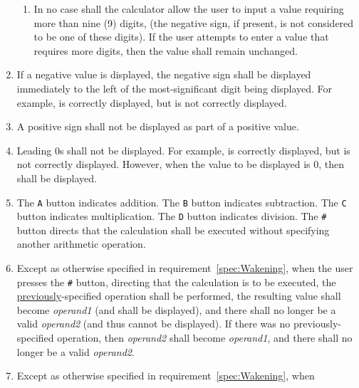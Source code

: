 \begin{enumerate}
\begin{enumerate}

    \item In no case shall the calculator allow the user to input a value requiring more than nine (9) digits, (the negative sign, if present, is not considered to be one of these digits). If the user attempts to enter a value that requires more digits, then the value shall remain unchanged.

    \end{enumerate}
\item \label{spec:Negative} If a negative value is displayed, the negative sign
    shall be displayed immediately to the left of the most-significant digit
    being displayed. For example,  is correctly displayed, but
     is not correctly displayed.
\item \label{spec:Positive} A positive sign shall not be displayed as part of a
    positive value.
\item \label{spec:LeadingZeroes} Leading 0s shall not be displayed. For
    example,  is correctly displayed, but  is
    not correctly displayed. However, when the value to be displayed is 0, then
     shall be displayed.
\item The \texttt{A} button indicates addition. The \texttt{B} button indicates
    subtraction. The \texttt{C} button indicates multiplication. The \texttt{D}
    button indicates division. The \texttt{\#} button directs that the
    calculation shall be executed without specifying another arithmetic
    operation.
\item Except as otherwise specified in requirement~\ref{spec:Wakening}, when
    the user presses the \texttt{\#} button, directing that the calculation is
    to be executed, the \underline{previously}-specified operation shall be
    performed, the resulting value shall become \textit{operand1} (and shall be
    displayed), and there shall no longer be a valid \textit{operand2} (and thus cannot be displayed). If
    there was no previously-specified operation, then \textit{operand2} shall
    become \textit{operand1}, and there shall no longer be a valid
    \textit{operand2}.
\item Except as otherwise specified in requirement~\ref{spec:Wakening}, when

\end{enumerate}
